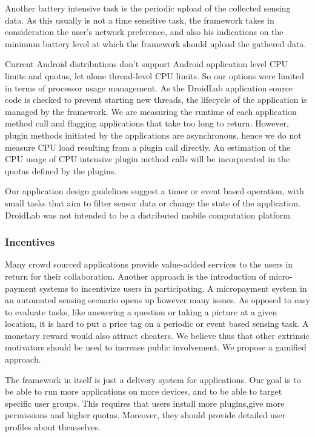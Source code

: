 \documentclass[conference,letterpaper]{IEEEtran}
\begin{document}
Another battery intensive task is the periodic upload of the collected sensing data. As this usually is not a time sensitive task, the framework takes in consideration the user's network preference, and also his indications on the minimum battery level at which the framework should upload the gathered data.



Current Android distributions don't support Android application level CPU limits and quotas, let alone thread-level CPU limits. So our options were limited in terms of processor usage management. As the DroidLab application source code is checked to prevent starting new threads, the lifecycle of the application is managed by the framework. We are measuring the runtime of each application method call and flagging applications that take too long to return. However, plugin methods initiated by the applications are asynchronous, hence we do not measure CPU load resulting from a plugin call directly. An estimation of the CPU usage of CPU intensive plugin method calls will be incorporated in the quotas defined by the plugins.

Our application design guidelines suggest a timer or event based operation, with small tasks that aim to filter sensor data or change the state of the application. DroidLab was not intended to be a distributed mobile computation platform.


\subsubsection{Incentives}

Many crowd sourced applications provide value-added services to the users in return for their collaboration. Another approach is the introduction of micro-payment systems to incentivize users in participating. A micropayment system in an automated sensing scenario opens up however many issues. As opposed to easy to evaluate tasks, like answering a question or taking a picture at a given location, it is hard to put a price tag on a periodic or event based sensing task. A monetary reward would also attract cheaters. We believe thus that other extrinsic motivators should be used to increase public involvement. We propose a gamified approach. 


The framework in itself is just a delivery system for applications. Our goal is to be able to run more applications on more devices, and to be able to target specific user groups. This requires that users install more plugins,give more permissions and higher quotas. Moreover, they should provide detailed user profiles about themselves.
\end{document}
